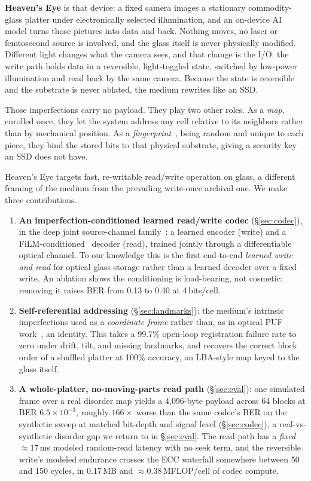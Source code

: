 \documentclass[letterpaper,twocolumn,10pt]{article}
\begin{document}
\textbf{Heaven's Eye} is that device: a fixed camera images a stationary commodity-glass
platter under electronically selected illumination, and an on-device AI model turns those
pictures into data and back.  Nothing moves, no laser or femtosecond source is
involved, and the glass itself is never physically modified.  Different light changes
what the camera sees, and that change is the I/O: the write path holds data in a
reversible, light-toggled state, switched by low-power illumination and read back by
the same camera.  Because the state is reversible and the substrate is never ablated,
the medium rewrites like an SSD.

Those imperfections carry no payload.  They play two other roles.  As a \emph{map},
enrolled once, they let the system address any cell relative to its neighbors rather
than by mechanical position.  As a
\emph{fingerprint}~\cite{pappu_puf_science02}, being random and unique to each piece,
they bind the stored bits to that physical substrate, giving a security key an SSD does
not have.

Heaven's Eye targets fast, re-writable read/write operation on glass, a different
framing of the medium from the prevailing write-once archival one.  We make three contributions.
\begin{enumerate}\itemsep2pt
\item \textbf{An imperfection-conditioned learned read/write codec}
(\S\ref{sec:codec}), in the deep joint source-channel
family~\cite{bourtsoulatze_deepjscc_tccn19}: a learned encoder (write) and a
FiLM-conditioned~\cite{perez_film_aaai18} decoder (read), trained jointly
through a differentiable optical channel.  To our knowledge this is the first
end-to-end \emph{learned write and read} for optical glass storage rather than a
learned decoder over a fixed write.  An ablation shows the conditioning is
load-bearing, not cosmetic: removing it raises BER from 0.13 to 0.40 at
4\,bits/cell.
\item \textbf{Self-referential addressing} (\S\ref{sec:landmarks}): the
medium's intrinsic imperfections used as a \emph{coordinate frame} rather than,
as in optical PUF work~\cite{pappu_puf_science02}, an identity.  This takes a
99.7\% open-loop registration failure rate to zero under drift, tilt, and
missing landmarks, and recovers the correct block order of a shuffled platter at
100\% accuracy, an LBA-style map keyed to the glass itself.
\item \textbf{A whole-platter, no-moving-parts read path} (\S\ref{sec:eval}): one
simulated frame over a real disorder map yields a 4{,}096-byte payload across 64 blocks
at BER $6.5\times10^{-3}$, roughly $166\times$ worse than the same codec's BER on the
synthetic sweep at matched bit-depth and signal level (\S\ref{sec:codec}), a real-vs-synthetic
disorder gap we return to in \S\ref{sec:eval}. The read path has a \emph{fixed}
$\approx$17\,ms modeled random-read latency with no seek term, and the reversible write's
modeled endurance crosses the ECC waterfall somewhere between 50 and 150 cycles, in
0.17\,MB and $\approx$0.38\,MFLOP/cell of codec compute.
\end{enumerate}
\end{document}
